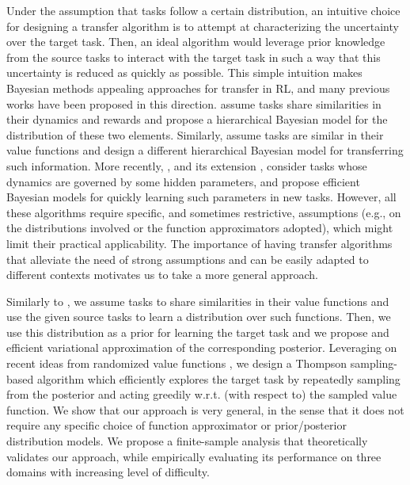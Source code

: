\documentclass{article}
\begin{document}
Under the assumption that tasks follow a certain distribution, an intuitive choice for designing a transfer algorithm is to attempt at characterizing the uncertainty over the target task. Then, an ideal algorithm would leverage prior knowledge from the source tasks to interact with the target task in such a way that this uncertainty is reduced as quickly as possible. This simple intuition makes Bayesian  methods appealing approaches for transfer in RL, and many previous works have been proposed in this direction. \cite{wilson2007multi} assume tasks share similarities in their dynamics and rewards and propose a hierarchical Bayesian model for the distribution of these two elements. Similarly, \cite{lazaric2010bayesian} assume tasks are similar in their value functions and design a different hierarchical Bayesian model for transferring such information. More recently, \cite{doshi2016hidden}, and its extension \cite{killian2017robust}, consider tasks whose dynamics are governed by some hidden parameters, and propose efficient Bayesian models for quickly learning such parameters in new tasks. However, all these algorithms require specific, and sometimes restrictive, assumptions (e.g., on the distributions involved or the function approximators adopted), which might limit their practical applicability. The importance of having transfer algorithms that alleviate the need of strong assumptions and can be easily adapted to different contexts motivates us to take a more general approach.

Similarly to \cite{lazaric2010bayesian}, we assume tasks to share similarities in their value functions and use the given source tasks to learn a distribution over such functions. Then, we use this distribution as a prior for learning the target task and we propose and efficient variational approximation of the corresponding posterior. Leveraging on recent ideas from randomized value functions \cite{osband2014generalization}, we design a Thompson sampling-based algorithm which efficiently explores the target task by repeatedly sampling from the posterior and acting greedily w.r.t. (with respect to) the sampled value function. We show that our approach is very general, in the sense that it does not require any specific choice of function approximator or prior/posterior distribution models. We propose a finite-sample analysis that theoretically validates our approach, while empirically evaluating its performance on three domains with increasing level of difficulty.
\end{document}
